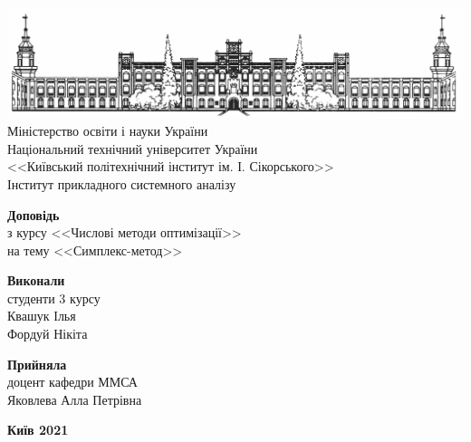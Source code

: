 \documentclass{report}
\begin{document}
\begin{titlepage}
    \thispagestyle{empty}
    \begin{center}
        \includegraphics[width = \textwidth]{pics/kpi}
        Міністерство освіти і науки України\\
        Національний технічний університет України\\
        <<Київський політехнічний інститут ім. І. Сікорського>>\\
        Інститут прикладного системного аналізу
    \end{center}
    \vspace{30mm}
    \begin{center}
        \fontsize{22}{26}\selectfont\textbf{Доповідь} \\
        з курсу <<Числові методи оптимізації>> \\
        на тему <<Симплекс-метод>>
    \end{center}
    \vspace{30mm}
    \begin{flushright}
        \textbf{Виконали} \\ 
        студенти 3 курсу \\
        Квашук Ілья \\
        Фордуй Нікіта
    \end{flushright}
    \begin{flushright}
        \textbf{Прийняла} \\
        доцент кафедри ММСА \\
        Яковлева Алла Петрівна
    \end{flushright}
    \vspace{45mm}
    \begin{center}
        \textbf{Київ 2021}
    \end{center}
\end{titlepage}
\end{document}

